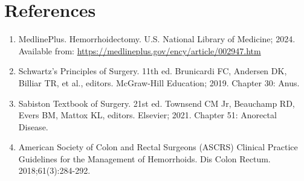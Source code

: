 \section*{References}
\begin{enumerate}
  \item MedlinePlus. Hemorrhoidectomy. U.S. National Library of Medicine; 2024. Available from: \url{https://medlineplus.gov/ency/article/002947.htm}
  
  \item Schwartz's Principles of Surgery. 11th ed. Brunicardi FC, Andersen DK, Billiar TR, et al., editors. McGraw-Hill Education; 2019. Chapter 30: Anus.
  
  \item Sabiston Textbook of Surgery. 21st ed. Townsend CM Jr, Beauchamp RD, Evers BM, Mattox KL, editors. Elsevier; 2021. Chapter 51: Anorectal Disease.
  
  \item American Society of Colon and Rectal Surgeons (ASCRS) Clinical Practice Guidelines for the Management of Hemorrhoids. Dis Colon Rectum. 2018;61(3):284-292.
\end{enumerate}

\clearpage
